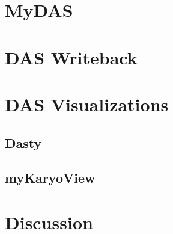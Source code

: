 \textbf{}



\section{MyDAS} \label{section:mydas}
\section{DAS Writeback}
\section{DAS Visualizations}
\subsection{Dasty} \label{section:dasty}
\subsection{myKaryoView}
\section{Discussion}